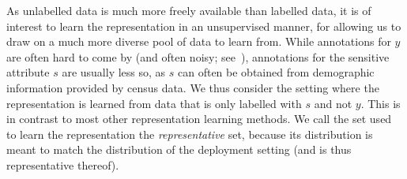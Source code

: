 As unlabelled data is much more freely available than labelled data, it is of interest to learn the
representation in an unsupervised manner, for allowing us to draw on a much more diverse pool of
data to learn from.
While annotations for $y$ are often hard to come by (and often noisy;
see~\citet{kehrenberg2020tuning}), annotations for the sensitive attribute $s$ are usually less so,
as $s$ can often be obtained from demographic information provided by census data. 
%
We thus consider the setting where the representation is learned from data that is only labelled
with $s$ and not $y$. 
%
This is in contrast to most other representation learning methods.
We call the set used to learn the representation the \emph{representative} set, because its
distribution is meant to match the distribution of the deployment setting (and is thus
representative thereof).

